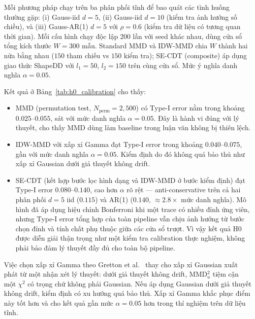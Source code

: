 Mỗi phương pháp chạy trên ba phân phối tĩnh để bao quát các tình huống thường gặp: (i) Gauss-iid $d=5$, (ii) Gauss-iid $d=10$ (kiểm tra ảnh hưởng số chiều), và (iii) Gauss-AR(1) $d=5$ với $\rho = 0.6$ (kiểm tra dữ liệu có tương quan thời gian). Mỗi cấu hình chạy độc lập 200 lần với seed khác nhau, dùng cửa sổ tổng kích thước $W = 300$ mẫu. Standard MMD và IDW-MMD chia $W$ thành hai nửa bằng nhau ($150$ tham chiếu vs $150$ kiểm tra); SE-CDT (composite) áp dụng giao thức ShapeDD với $l_1 = 50$, $l_2 = 150$ trên cùng cửa sổ. Mức ý nghĩa danh nghĩa $\alpha = 0.05$.

\begin{table}[H]
	\centering
	\caption[Tỉ lệ Type-I error trên dữ liệu tĩnh]{Tỉ lệ Type-I error trên dữ liệu tĩnh (200 lần chạy mỗi cell, $\alpha = 0.05$). Số sau dấu $\pm$ là nửa khoảng tin cậy 95\% theo Wilson.}
	\label{tab:h0_calibration}
	
\end{table}

Kết quả ở Bảng~\ref{tab:h0_calibration} cho thấy:
\begin{itemize}
	\item MMD (permutation test, $N_{\text{perm}} = 2{,}500$) có Type-I error nằm trong khoảng $0.025$--$0.055$, sát với mức danh nghĩa $\alpha = 0.05$. Đây là hành vi đúng với lý thuyết, cho thấy MMD dùng làm baseline trong luận văn không bị thiên lệch.
	\item IDW-MMD với xấp xỉ Gamma đạt Type-I error trong khoảng $0.040$--$0.075$, gần với mức danh nghĩa $\alpha = 0.05$. Kiểm định do đó không quá bảo thủ như xấp xỉ Gaussian dưới giả thuyết không drift.
	\item SE-CDT (kết hợp bước lọc hình dạng và IDW-MMD ở bước kiểm định) đạt Type-I error $0.080$--$0.140$, cao hơn $\alpha$ rõ rệt --- anti-conservative trên cả hai phân phối $d=5$ iid ($0.115$) và AR(1) ($0.140$, $\approx 2.8\times$ mức danh nghĩa). Mô hình đã áp dụng hiệu chỉnh Bonferroni khi một trace có nhiều đỉnh ứng viên, nhưng Type-I error tổng hợp của toàn pipeline vẫn chịu ảnh hưởng từ bước chọn đỉnh và tính chất phụ thuộc giữa các cửa sổ trượt. Vì vậy kết quả H0 được diễn giải thận trọng như một kiểm tra calibration thực nghiệm, không phải bảo đảm lý thuyết đầy đủ cho toàn bộ pipeline.
\end{itemize}

Việc chọn xấp xỉ Gamma theo Gretton et al.~\cite{gretton2009gamma} thay cho xấp xỉ Gaussian xuất phát từ một nhận xét lý thuyết: dưới giả thuyết không drift, MMD$^2_u$ tiệm cận một $\chi^2$ có trọng chứ không phải Gaussian. Nếu áp dụng Gaussian dưới giả thuyết không drift, kiểm định có xu hướng quá bảo thủ. Xấp xỉ Gamma khắc phục điểm này tốt hơn và cho kết quả gần mức $\alpha = 0.05$ hơn trong thí nghiệm trên dữ liệu tĩnh.

